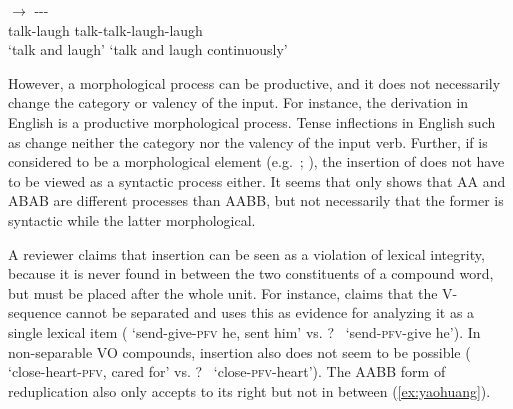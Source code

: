   \ex \gll {} $\rightarrow$ ---\\
  talk-laugh {} talk-talk-laugh-laugh\\ 
  \glt `talk and laugh' `talk and laugh continuously'
  \z
\z

However, a morphological process can be productive, and it does not necessarily change the category or valency of the input.
For instance, the  derivation in English is a productive morphological process.
Tense inflections in English such as  change neither the category nor the valency of the input verb.
Further, if  is considered to be a morphological element (e.g.\ \citealt[101--102]{Huangetal2009}; \citealt[246]{MuellerLipenkova2013}), the insertion of  does not have to be viewed as a syntactic
process either.
It seems that \citet{Xie2020} only shows that AA and ABAB are different processes than AABB, but not necessarily that the former is syntactic while the latter morphological.

A reviewer claims that  insertion can be seen as a violation of lexical integrity,
because it is never found in between the two constituents of a compound word,
but must be placed after the whole unit.
For instance, \citet[1282]{Her2006} claims that the V- sequence cannot be separated 
and uses this as evidence for analyzing it as a single lexical item 
(  `send-give-\textsc{pfv} he, sent him' vs. ?\   `send-\textsc{pfv}-give he').
In non-separable VO compounds,  insertion also does not seem to be possible 
( `close-heart-\textsc{pfv}, cared for' vs. ?\  `close-\textsc{pfv}-heart').
The AABB form of reduplication also only accepts  to its right but not in between (\ref{ex:yaohuang}).
\ea\label{ex:yaohuang} %

